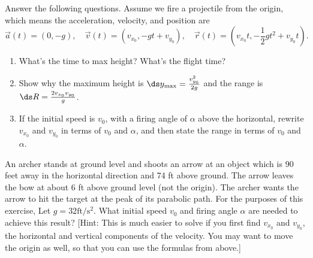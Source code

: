 \begin{problem}%
 Answer the following questions. Assume we fire a projectile from the origin, which means the acceleration, velocity, and position are 
$$ \vec a(t) = (0,-g),\quad 
\vec v(t) = (v_{x_0}, -gt+ v_{y_0}),\quad
\vec r(t) = (v_{x_0}t, -\frac12 gt^2+ v_{y_0}t)
.$$
\begin{enumerate}
 \item What's the time to max height?  What's the flight time? 
 \item Show why the maximum height is $\ds y_{\max}=\frac{v_{y_0}^2}{2g}$ and the range is $\ds R=\frac{2v_{x_0}v_{y_0}}{g}$.
 \item If the initial speed is $v_0$, with a firing angle of $\alpha$ above the horizontal, rewrite $v_{x_0}$ and $v_{y_0}$ in terms of $v_0$ and $\alpha$, and then state the range in terms of $v_0$ and $\alpha$. 
\end{enumerate}
\end{problem}

\begin{problem}
%

 An archer stands at ground level and shoots an arrow at an object which is 90 feet away in the horizontal direction and 74 ft above ground. The arrow leaves the bow at about 6 ft above ground level (not the origin). 
 The archer wants the arrow to hit the target at the peak of its parabolic path. 
 For the purposes of this exercise, Let $g = 32 \text{ft}/\text{s}^2$. 
 What initial speed $v_0$ and firing angle $\alpha$ are needed to achieve this result? 
 [Hint: This is much easier to solve if you first find $v_{x_0}$ and $v_{y_0}$, the horizontal and vertical components of the velocity. You may want to move the origin as well, so that you can use the formulas from above.]
\end{problem}


